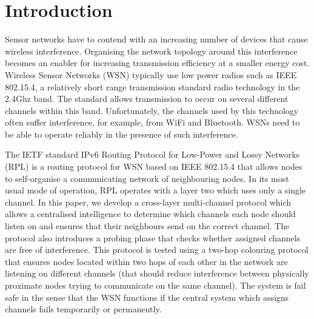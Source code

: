 \section{Introduction}
\label{sec:introduction}

Sensor networks have to contend with an increasing number of devices that cause wireless interference. Organising the network topology around this interference becomes an enabler for increasing transmission efficiency at a smaller energy cost. Wireless Sensor Networks (WSN) typically use low power radios such as IEEE 802.15.4, a relatively short range transmission standard radio technology in the 2.4Ghz band. The standard allows transmission to occur on several different channels within this band.  Unfortunately, the
channels used by this technology often suffer interference, for example, from WiFi and Bluetooth.  WSNs need to be
able to operate reliably in the presence of such interference.  

The IETF standard IPv6 Routing Protocol for Low-Power and Lossy Networks (RPL) is a routing protocol for WSN based on IEEE 802.15.4 that allows nodes to self-organise a communicating network of neighbouring nodes. In
its most usual mode of operation, RPL operates with a layer two which uses only a single channel. In this paper, we develop a cross-layer multi-channel
protocol which allows a centralised intelligence to determine which channels each node should listen on and ensures that their neighbours send on the correct channel. The protocol also introduces a probing phase that checks whether assigned channels are free of interference.  This protocol is tested using a two-hop colouring protocol that ensures nodes located within two hops of each other in the network are listening on different channels (that should reduce interference between physically proximate nodes trying to communicate on the same channel).  The system is fail safe in the sense that the WSN functions if the central system which assigns channels fails temporarily or permanently.


